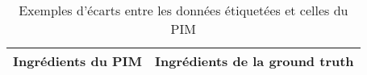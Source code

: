 \begin{longtable}{p{7cm}p{7cm}}
\caption{Exemples d'écarts entre les données étiquetées et celles du PIM}\label{tbl:ingredient_comparison}\\ \hline

\toprule
                                                                                                                                                                                                                                                                                                                                                                                                                                                                                                                                                                                                                                                                                                                                                                                              Ingrédients du PIM &                                                                                                                                                                                                                                                                                                                                                                                                                                                                                                                                                                                                                                                                                                                                                                             Ingrédients de la ground truth \\
\midrule
\endfirsthead
\toprule

\end{longtable}
